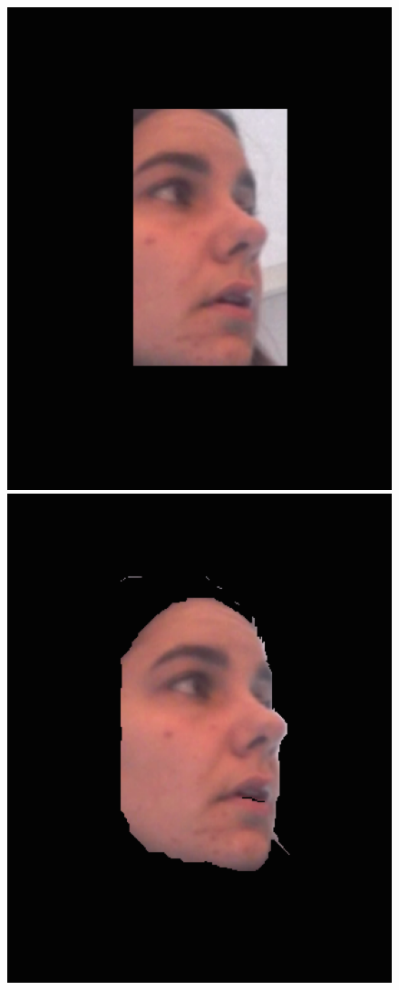 \documentclass[10pt,twocolumn,letterpaper]{article}
\begin{document}
\begin{figure}
\begin{center}
	\includegraphics[scale=0.25]{figures/turn_bb}
	\includegraphics[scale=0.25]{figures/turn_segment}

\end{center}
\end{figure}
\end{document}
